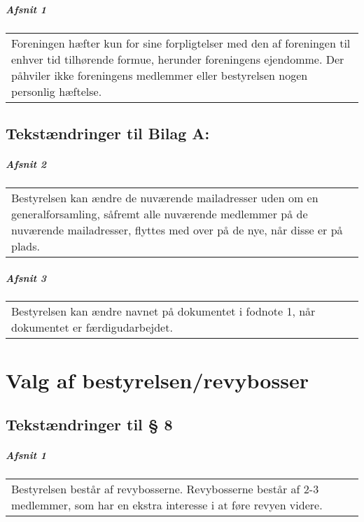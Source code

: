 \documentclass[a4paper,11pt]{report}
\newenvironment{quotationb}%
{\begin{tabular}{|p{10cm}}}%
{\\\end{tabular}}
\begin{document}
\begin{appendices}
\paragraph{Afsnit 1}

\begin{quotationb}
Foreningen hæfter kun for sine forpligtelser med den af foreningen til enhver
tid tilhørende formue, herunder foreningens ejendomme.  Der påhviler ikke
foreningens medlemmer eller bestyrelsen nogen personlig hæftelse.
\end{quotationb}

\section*{Tekstændringer til Bilag A:}

\paragraph{Afsnit 2}

\begin{quotationb}
Bestyrelsen kan ændre de nuværende mailadresser uden om en generalforsamling,
såfremt alle nuværende medlemmer på de nuværende mailadresser, flyttes med
over på de nye, når disse er på plads.
\end{quotationb}

\paragraph{Afsnit 3}

\begin{quotationb}
Bestyrelsen kan ændre navnet på dokumentet i fodnote 1, når dokumentet er
færdigudarbejdet.
\end{quotationb}

\chapter{Valg af bestyrelsen/revybosser}
\label{app:b3}

\section*{Tekstændringer til § 8}

\paragraph{Afsnit 1}

\begin{quotationb}
Bestyrelsen består af revybosserne.  Revybosserne består af 2-3 medlemmer,
som har en ekstra interesse i at føre revyen videre.
\end{quotationb}


\end{appendices}
\end{document}
